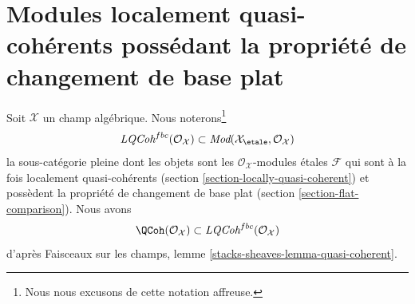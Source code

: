 \section[Modules quasi-cohérents et changement de base plat]{Modules localement quasi-cohérents possédant la propriété de changement de base plat}
\label{section-loc-qcoh-flat-base-change}

\noindent
Soit $\mathcal{X}$ un champ algébrique. Nous noterons\footnote{Nous nous excusons
de cette notation affreuse.}
$$
\textit{LQCoh}^{fbc}(\mathcal{O}_\mathcal{X})
\subset
\textit{Mod}(\mathcal{X}_\etale, \mathcal{O}_\mathcal{X})
$$
la sous-catégorie pleine dont les objets sont les
$\mathcal{O}_\mathcal{X}$-modules étales $\mathcal{F}$
qui sont à la fois localement quasi-cohérents
(section \ref{section-locally-quasi-coherent})
et possèdent la propriété de changement de base plat
(section \ref{section-flat-comparison}).
Nous avons
$$
\QCoh(\mathcal{O}_\mathcal{X}) \subset
\textit{LQCoh}^{fbc}(\mathcal{O}_\mathcal{X})
$$
d'après Faisceaux sur les champs, lemme \ref{stacks-sheaves-lemma-quasi-coherent}.

